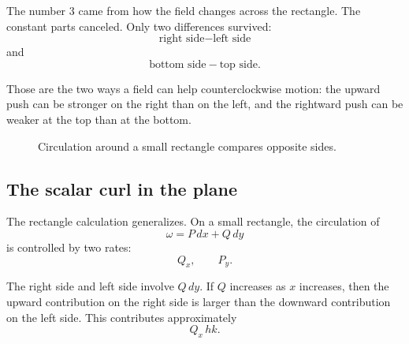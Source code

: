 The number \(3\) came from how the field changes across the rectangle.  The constant
parts canceled.  Only two differences survived:
\[
    \text{right side} - \text{left side}
\]
and
\[
    \text{bottom side} - \text{top side}.
\]

Those are the two ways a field can help counterclockwise motion: the upward push can
be stronger on the right than on the left, and the rightward push can be weaker at the
top than at the bottom.

\begin{figure}[h]
\centering
{}
\caption{Circulation around a small rectangle compares opposite sides.}
\end{figure}

\subsection{The scalar curl in the plane}

The rectangle calculation generalizes.  On a small rectangle, the circulation of
\[
    \omega=P\,dx+Q\,dy
\]
is controlled by two rates:
\[
    Q_x,
    \qquad
    P_y.
\]

The right side and left side involve \(Q\,dy\).  If \(Q\) increases as \(x\) increases,
then the upward contribution on the right side is larger than the downward contribution
on the left side.  This contributes approximately
\[
    Q_x\,hk.
\]

